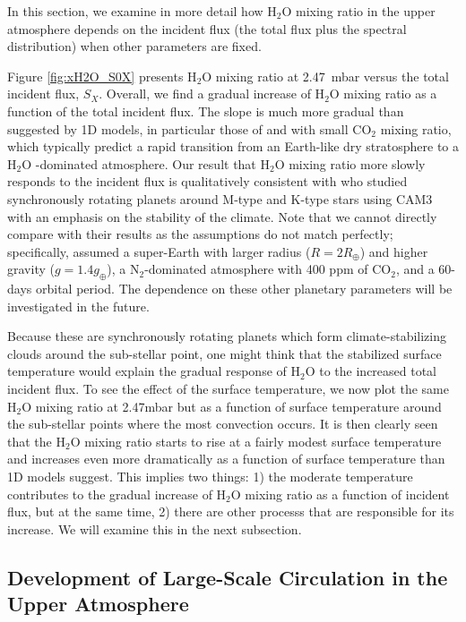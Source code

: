 \documentclass[11pt,numberedappendix,twocolappendix,]{emulateapj}
\def\water{H$_2$O }
\def\preslevel{2.47}
\begin{document}
In this section, we examine in more detail how \water mixing ratio in the upper atmosphere depends on the incident flux (the total flux plus the spectral distribution) when other parameters are fixed. 

Figure \ref{fig:xH2O_S0X} presents \water mixing ratio at \preslevel ~mbar versus the total incident flux, $S_X$. 
Overall, we find a gradual increase of \water mixing ratio as a function of the total incident flux. 
The slope is much more gradual than suggested by 1D models, in particular those  of \citet{Kasting1993} and \citet{Wordsworth2013} with small CO$_2$ mixing ratio, which typically predict a rapid transition from an Earth-like dry stratosphere to a \water-dominated atmosphere. 
Our result that \water mixing ratio more slowly responds to the incident flux is qualitatively consistent with \citet{Yang2013} who studied synchronously rotating planets around M-type and K-type stars using CAM3 with an emphasis on the stability of the climate. 
Note that we cannot directly compare with their results as the assumptions do not match perfectly; specifically, \cite{Yang2013} assumed a super-Earth with larger radius ($R=2R_{\oplus}$) and higher gravity ($g=1.4g_{\oplus}$), a N$_2$-dominated atmosphere with 400 ppm of CO$_2$, and a 60-days orbital period. 
The dependence on these other planetary parameters will be investigated in the future. 

Because these are synchronously rotating planets which form climate-stabilizing clouds around the sub-stellar point, one might think that the stabilized surface temperature would explain the gradual response of \water to the increased total incident flux. 
To see the effect of the surface temperature, we now plot the same \water mixing ratio at \preslevel mbar but as a function of surface temperature around the sub-stellar points where the most convection occurs. 
It is then clearly seen that the \water mixing ratio starts to rise at a fairly modest surface temperature and increases even more dramatically as a function of surface temperature than 1D models suggest. 
This implies two things: 1) the moderate temperature contributes to the gradual increase of \water mixing ratio as a function of incident flux, but at the same time, 2) there are other processs that are responsible for its increase. 
We will examine this in the next subsection. 

\subsection{Development of Large-Scale Circulation in the Upper Atmosphere}
\label{ss:result_omega}
\end{document}
